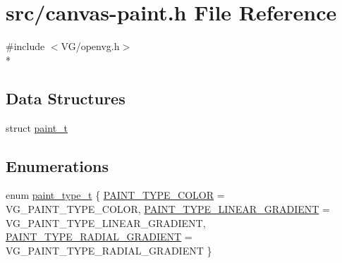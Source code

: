 \hypertarget{canvas-paint_8h}{}\section{src/canvas-\/paint.h File Reference}
\label{canvas-paint_8h}
{\ttfamily \#include $<$V\+G/openvg.\+h$>$}\\*
\subsection*{Data Structures}
\begin{DoxyCompactItemize}
\item 
struct \hyperlink{structpaint__t}{paint\+\_\+t}
\end{DoxyCompactItemize}
\subsection*{Enumerations}
\begin{DoxyCompactItemize}
\item 
enum \hyperlink{canvas-paint_8h_a2d52f465c03f4e659488016e2d62633d}{paint\+\_\+type\+\_\+t} \{ \hyperlink{canvas-paint_8h_a2d52f465c03f4e659488016e2d62633da218bc062477c243bb67841b9de7b941c}{P\+A\+I\+N\+T\+\_\+\+T\+Y\+P\+E\+\_\+\+C\+O\+L\+O\+R} = V\+G\+\_\+\+P\+A\+I\+N\+T\+\_\+\+T\+Y\+P\+E\+\_\+\+C\+O\+L\+O\+R, 
\hyperlink{canvas-paint_8h_a2d52f465c03f4e659488016e2d62633daf23252d14cb7657b439397dda1a426cc}{P\+A\+I\+N\+T\+\_\+\+T\+Y\+P\+E\+\_\+\+L\+I\+N\+E\+A\+R\+\_\+\+G\+R\+A\+D\+I\+E\+N\+T} = V\+G\+\_\+\+P\+A\+I\+N\+T\+\_\+\+T\+Y\+P\+E\+\_\+\+L\+I\+N\+E\+A\+R\+\_\+\+G\+R\+A\+D\+I\+E\+N\+T, 
\hyperlink{canvas-paint_8h_a2d52f465c03f4e659488016e2d62633da097f446bdab24053839ae7d6f660bee2}{P\+A\+I\+N\+T\+\_\+\+T\+Y\+P\+E\+\_\+\+R\+A\+D\+I\+A\+L\+\_\+\+G\+R\+A\+D\+I\+E\+N\+T} = V\+G\+\_\+\+P\+A\+I\+N\+T\+\_\+\+T\+Y\+P\+E\+\_\+\+R\+A\+D\+I\+A\+L\+\_\+\+G\+R\+A\+D\+I\+E\+N\+T
 \}
\end{DoxyCompactItemize}
